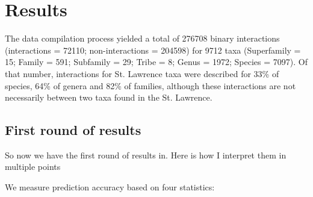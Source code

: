 \documentclass[letterpaper]{article}
\begin{document}
\section{Results}
%
%


The data compilation process yielded a total of 276708 binary interactions (interactions = 72110; non-interactions = 204598) for 9712 taxa (Superfamily = 15; Family = 591; Subfamily = 29; Tribe = 8; Genus = 1972; Species = 7097). Of that number, interactions for St. Lawrence taxa were described for 33\% of species, 64\% of genera and 82\% of families, although these interactions are not necessarily between two taxa found in the St. Lawrence.


\subsection{First round of results}
So now we have the first round of results in. Here is how I interpret them in multiple points

We measure prediction accuracy based on four statistics:
\end{document}
